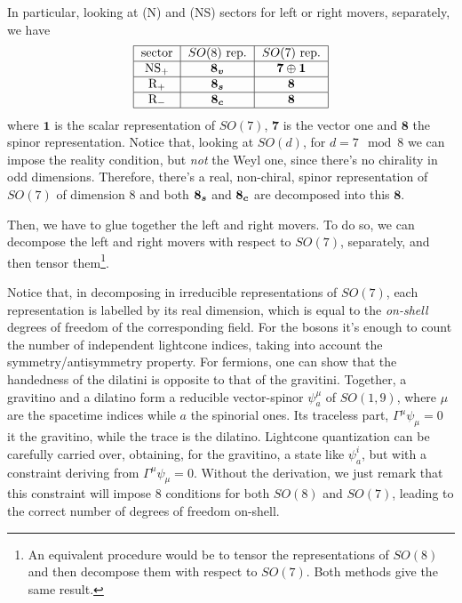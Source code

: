 In particular, looking at (N) and (NS) sectors for left or right movers, separately, we have
\begin{equation}
        \begin{tabular}{|c|c|c|}
     \hline   sector & $SO(8)$ rep. & $SO(7)$ rep.    \\ \hline
        NS$_+$ & $\v$ & $\boldsymbol{7} \oplus \boldsymbol{1}$ \\ \hline
        R$_+$  & $\s$ &$ \boldsymbol{8}  $  \\ \hline
        R$_-$  & $\c$ & $\boldsymbol{8} $ \\\hline                                                
        \end{tabular}
\end{equation}
where $\boldsymbol{1}$ is the scalar representation of $SO(7)$, $\boldsymbol{7}$ is the vector one and $\boldsymbol{8}$ the spinor representation. Notice that, looking at $SO(d)$, for $d = 7 \mod 8$ we can impose the reality condition, but \emph{not} the Weyl one, since there's no chirality in odd dimensions. Therefore, there's a real, non-chiral, spinor representation of $SO(7)$ of dimension $8$ and both $\boldsymbol{8_s}$ and $\boldsymbol{8_c}$ are decomposed into this $\boldsymbol{8}$.

Then, we have to glue together the left and right movers. To do so, we can decompose the left and right movers with respect to $SO(7)$, separately, and then tensor them\footnote{An equivalent procedure would be to tensor the representations of $SO(8)$ and then decompose them with respect to $SO(7)$. Both methods give the same result.}.
\begin{equation*}

\end{equation*}

Notice that, in decomposing in irreducible representations of $SO(7)$, each representation is labelled by its real dimension, which is equal to the \emph{on-shell} degrees of freedom of the corresponding field. For the bosons it's enough to count the number of independent lightcone indices, taking into account the symmetry/antisymmetry property. For fermions, one can show that the handedness of the dilatini is opposite to that of the gravitini. Together, a gravitino and a dilatino form a reducible vector-spinor $\psi^\mu_a$ of $SO(1,9)$, where $\mu$ are the spacetime indices while $a$ the spinorial ones. Its traceless part, $\Gamma^\mu \psi_\mu = 0$ it the gravitino, while the trace is the dilatino. Lightcone quantization can be carefully carried over, obtaining, for the gravitino, a state like $\psi^i_a$, but with a constraint deriving from $\Gamma^\mu \psi_\mu = 0$. Without the derivation, we just remark that this constraint will impose $8$ conditions for both $SO(8)$ and $SO(7)$, leading to the correct number of degrees of freedom on-shell.

